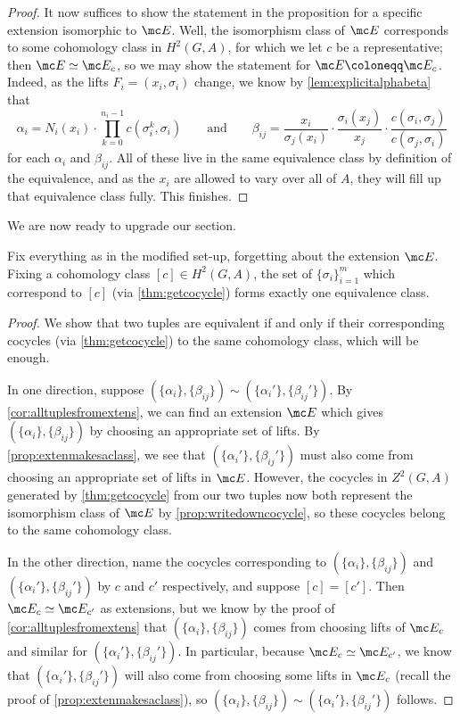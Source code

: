 \documentclass{article}
\numberwithin{equation}{section}
\begin{document}
\begin{proof}
	It now suffices to show the statement in the proposition for a specific extension isomorphic to $\mc E$. Well, the isomorphism class of $\mc E$ corresponds to some cohomology class in $H^2( G,A)$, for which we let $c$ be a representative; then $\mc E\simeq\mc E_c$, so we may show the statement for $\mc E\coloneqq\mc E_c$. Indeed, as the lifts $F_i=(x_i,\sigma_i)$ change, we know by \autoref{lem:explicitalphabeta} that
	\[\alpha_i=N_i(x_i)\cdot\prod_{k=0}^{n_i-1}c\left(\sigma_i^k,\sigma_i\right)\qquad\text{and}\qquad\beta_{ij}=\frac{x_i}{\sigma_j(x_i)}\cdot\frac{\sigma_i(x_j)}{x_j}\cdot\frac{c(\sigma_i,\sigma_j)}{c(\sigma_j,\sigma_i)}\]
	for each $\alpha_i$ and $\beta_{ij}$. All of these live in the same equivalence class by definition of the equivalence, and as the $x_i$ are allowed to vary over all of $A$, they will fill up that equivalence class fully. This finishes.
\end{proof}
We are now ready to upgrade our section.
\begin{cor} \label{cor:cohomologymakesaclass}
	Fix everything as in the modified set-up, forgetting about the extension $\mc E$. Fixing a cohomology class $[c]\in H^2( G,A)$, the set of $\{\sigma_i\}_{i=1}^m$ which correspond to $[c]$ (via \autoref{thm:getcocycle}) forms exactly one equivalence class.
\end{cor}
\begin{proof}
	We show that two tuples are equivalent if and only if their corresponding cocycles (via \autoref{thm:getcocycle}) to the same cohomology class, which will be enough.
	
	In one direction, suppose $(\{\alpha_i\},\{\beta_{ij}\})\sim(\{\alpha_i'\},\{\beta_{ij}'\})$. By \autoref{cor:alltuplesfromextens}, we can find an extension $\mc E$ which gives $(\{\alpha_i\},\{\beta_{ij}\})$ by choosing an appropriate set of lifts. By \autoref{prop:extenmakesaclass}, we see that $(\{\alpha_i'\},\{\beta_{ij}'\})$ must also come from choosing an appropriate set of lifts in $\mc E$. However, the cocycles in $Z^2( G,A)$ generated by \autoref{thm:getcocycle} from our two tuples now both represent the isomorphism class of $\mc E$ by \autoref{prop:writedowncocycle}, so these cocycles belong to the same cohomology class.

	In the other direction, name the cocycles corresponding to $(\{\alpha_i\},\{\beta_{ij}\})$ and $(\{\alpha_i'\},\{\beta_{ij}'\})$ by $c$ and $c'$ respectively, and suppose $[c]=[c']$. Then $\mc E_c\simeq\mc E_{c'}$ as extensions, but we know by the proof of \autoref{cor:alltuplesfromextens} that $(\{\alpha_i\},\{\beta_{ij}\})$ comes from choosing lifts of $\mc E_c$ and similar for $(\{\alpha_i'\},\{\beta_{ij}'\})$. In particular, because $\mc E_c\simeq\mc E_{c'}$, we know that $(\{\alpha_i'\},\{\beta_{ij}'\})$ will also come from choosing some lifts in $\mc E_c$ (recall the proof of \autoref{prop:extenmakesaclass}), so $(\{\alpha_i\},\{\beta_{ij}\})\sim(\{\alpha_i'\},\{\beta_{ij}'\})$ follows.
\end{proof}
\end{document}
